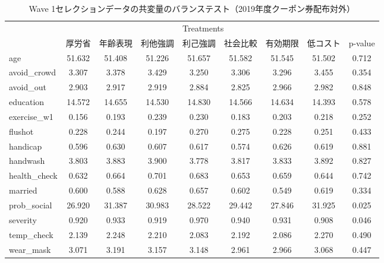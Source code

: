 \documentclass[
  11pt,
  a4paper,
]{article}
\begin{document}
\begin{table}

\caption{\label{tab:show-int-coupon0-balance}Wave 1セレクションデータの共変量のバランステスト（2019年度クーポン券配布対外）}
\centering
\begin{tabular}[t]{lcccccccc}
\toprule
\multicolumn{1}{c}{ } & \multicolumn{7}{c}{Treatments} & \multicolumn{1}{c}{ } \\
\cmidrule(l{3pt}r{3pt}){2-8}
  & 厚労省 & 年齢表現 & 利他強調 & 利己強調 & 社会比較 & 有効期限 & 低コスト & p-value\\
\midrule
age & 51.632 & 51.408 & 51.226 & 51.657 & 51.582 & 51.545 & 51.502 & 0.712\\
avoid\_crowd & 3.307 & 3.378 & 3.429 & 3.250 & 3.306 & 3.296 & 3.455 & 0.354\\
avoid\_out & 2.903 & 2.917 & 2.919 & 2.884 & 2.825 & 2.966 & 2.982 & 0.848\\
education & 14.572 & 14.655 & 14.530 & 14.830 & 14.566 & 14.634 & 14.393 & 0.578\\
exercise\_w1 & 0.156 & 0.193 & 0.239 & 0.230 & 0.183 & 0.203 & 0.218 & 0.252\\
flushot & 0.228 & 0.244 & 0.197 & 0.270 & 0.275 & 0.228 & 0.251 & 0.433\\
handicap & 0.596 & 0.630 & 0.607 & 0.617 & 0.574 & 0.626 & 0.619 & 0.881\\
handwash & 3.803 & 3.883 & 3.900 & 3.778 & 3.817 & 3.833 & 3.892 & 0.827\\
health\_check & 0.632 & 0.664 & 0.701 & 0.683 & 0.653 & 0.659 & 0.644 & 0.742\\
married & 0.600 & 0.588 & 0.628 & 0.657 & 0.602 & 0.549 & 0.619 & 0.334\\
prob\_social & 26.920 & 31.387 & 30.983 & 28.522 & 29.442 & 27.846 & 31.925 & 0.025\\
severity & 0.920 & 0.933 & 0.919 & 0.970 & 0.940 & 0.931 & 0.908 & 0.046\\
temp\_check & 2.139 & 2.248 & 2.210 & 2.083 & 2.192 & 2.086 & 2.270 & 0.490\\
wear\_mask & 3.071 & 3.191 & 3.157 & 3.148 & 2.961 & 2.966 & 3.068 & 0.447\\
\bottomrule
\end{tabular}
\end{table}
\end{document}

